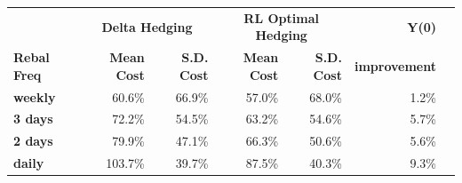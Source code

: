 \documentclass{article}
\begin{document}
\begin{table}[htbp]
\centering
\vspace{0.4em}
\begin{tabular}{lrrrrrr}
\hline
 & \multicolumn{2}{c}{\textbf{Delta Hedging}} & \multicolumn{2}{c}{\textbf{RL Optimal Hedging}} & \textbf{Y(0)} \\
\textbf{Rebal Freq} & \textbf{Mean Cost} & \textbf{S.D. Cost} & \textbf{Mean Cost} & \textbf{S.D. Cost} & \textbf{improvement} \\
\hline
\textbf{weekly} & 60.6\% & 66.9\% & 57.0\% & 68.0\% & 1.2\% \\
\textbf{3 days} & 72.2\% & 54.5\% & 63.2\% & 54.6\% & 5.7\% \\
\textbf{2 days} & 79.9\% & 47.1\% & 66.3\% & 50.6\% & 5.6\% \\
\textbf{daily} & 103.7\% & 39.7\% & 87.5\% & 40.3\% & 9.3\% \\
\hline
\end{tabular}
\end{table}
\end{document}
